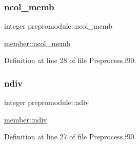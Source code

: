 \subsubsection{\texorpdfstring{ncol\+\_\+memb}{ncol\_memb}}
{\footnotesize\ttfamily integer prepromodule\+::ncol\+\_\+memb\hspace{0.3cm}{\ttfamily [private]}}



\hyperlink{namespacemember_a20895477b227a3352a4e758b21b01bf8}{member\+::ncol\+\_\+memb} 



Definition at line 28 of file Preprocess.\+f90.

\mbox{\label{namespaceprepromodule_a6339275501f8c1e8f0b418c9e918005e}} 
\subsubsection{\texorpdfstring{ndiv}{ndiv}}
{\footnotesize\ttfamily integer prepromodule\+::ndiv\hspace{0.3cm}{\ttfamily [private]}}



\hyperlink{namespacemember_a3e6a3b0896edb5c30c113dc22ab7181a}{member\+::ndiv} 



Definition at line 27 of file Preprocess.\+f90.

